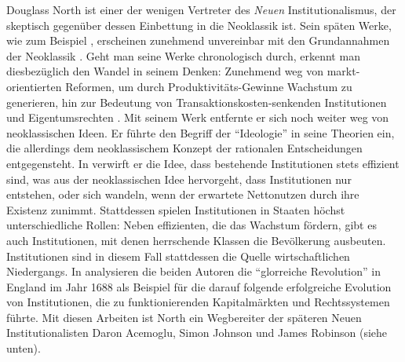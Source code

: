 Douglass North ist einer der wenigen Vertreter des \textit{Neuen} Institutionalismus, der skeptisch gegenüber dessen Einbettung in die Neoklassik ist. Sein späten Werke, wie zum Beispiel \textcite{North2005}, erscheinen zunehmend unvereinbar mit den Grundannahmen der Neoklassik \textcite[S. 44]{Voigt2009}. Geht man seine Werke chronologisch durch, erkennt man diesbezüglich den Wandel in seinem Denken: Zunehmend weg von markt-orientierten Reformen, um durch Produktivitäts-Gewinne Wachstum zu generieren, hin zur Bedeutung von Transaktionskosten-senkenden Institutionen und Eigentumsrechten \parencite{Jung2025}. Mit seinem Werk \textcite{North1981} entfernte er sich noch weiter weg von neoklassischen Ideen. Er führte den Begriff der "`Ideologie"' in seine Theorien ein, die allerdings dem neoklassischem Konzept der rationalen Entscheidungen entgegensteht. In \textcite{North1981} verwirft er die Idee, dass bestehende Institutionen stets effizient sind, was aus der neoklassischen Idee hervorgeht, dass Institutionen nur entstehen, oder sich wandeln, wenn der erwartete Nettonutzen durch ihre Existenz zunimmt. Stattdessen spielen Institutionen in Staaten höchst unterschiedliche Rollen: Neben effizienten, die das Wachstum fördern, gibt es auch Institutionen, mit denen herrschende Klassen die Bevölkerung ausbeuten. Institutionen sind in diesem Fall stattdessen die Quelle wirtschaftlichen Niedergangs. In \textcite{North1989} analysieren die beiden Autoren die "`glorreiche Revolution"' in England im Jahr 1688 als Beispiel für die darauf folgende erfolgreiche Evolution von Institutionen, die zu funktionierenden Kapitalmärkten und Rechtssystemen führte. Mit diesen Arbeiten ist North ein Wegbereiter der späteren Neuen Institutionalisten Daron Acemoglu, Simon Johnson und James Robinson (siehe unten).

